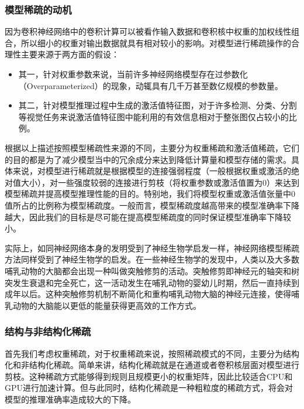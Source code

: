 \documentclass[letterpaper,10pt,english]{sphinxmanual}
\begin{document}
\subsubsection{模型稀疏的动机}
\label{\detokenize{chapter_model_deployment/model_compression:id6}}
\sphinxAtStartPar
因为卷积神经网络中的卷积计算可以被看作输入数据和卷积核中权重的加权线性组合，所以细小的权重对输出数据就具有相对较小的影响。对模型进行稀疏操作的合理性主要来源于两方面的假设：
\begin{itemize}
\item {} 
\sphinxAtStartPar
其一，针对权重参数来说，当前许多神经网络模型存在过参数化（Over\sphinxhyphen{}parameterized）的现象，动辄具有几千万甚至数亿规模的参数量。

\item {} 
\sphinxAtStartPar
其二，针对模型推理过程中生成的激活值特征图，对于许多检测、分类、分割等视觉任务来说激活值特征图中能利用的有效信息相对于整张图仅占较小的比例。

\end{itemize}

\sphinxAtStartPar
根据以上描述按照模型稀疏性来源的不同，主要分为权重稀疏和激活值稀疏，它们的目的都是为了减少模型当中的冗余成分来达到降低计算量和模型存储的需求。具体来说，对模型进行稀疏就是根据模型的连接强弱程度（一般根据权重或激活的绝对值大小），对一些强度较弱的连接进行剪枝（将权重参数或激活值置为0）来达到模型稀疏并提高模型推理性能的目的。特别地，我们将模型权重或激活值张量中0值所占的比例称为模型稀疏度。一般而言，模型稀疏度越高带来的模型准确率下降越大，因此我们的目标是尽可能在提高模型稀疏度的同时保证模型准确率下降较小。

\sphinxAtStartPar
实际上，如同神经网络本身的发明受到了神经生物学启发一样，神经网络模型稀疏方法同样受到了神经生物学的启发。在一些神经生物学的发现中，人类以及大多数哺乳动物的大脑都会出现一种叫做突触修剪的活动。突触修剪即神经元的轴突和树突发生衰退和完全死亡，这一活动发生在哺乳动物的婴幼儿时期，然后一直持续到成年以后。这种突触修剪机制不断简化和重构哺乳动物大脑的神经元连接，使得哺乳动物的大脑能以更低的能量获得更高效的工作方式。


\subsubsection{结构与非结构化稀疏}
\label{\detokenize{chapter_model_deployment/model_compression:id7}}
\sphinxAtStartPar
首先我们考虑权重稀疏，对于权重稀疏来说，按照稀疏模式的不同，主要分为结构化和非结构化稀疏。简单来讲，结构化稀疏就是在通道或者卷积核层面对模型进行剪枝。这种稀疏方式能够得到规则且规模更小的权重矩阵，因此比较适合CPU和GPU进行加速计算。但与此同时，结构化稀疏是一种粗粒度的稀疏方式，将会对模型的推理准确率造成较大的下降。
\end{document}
